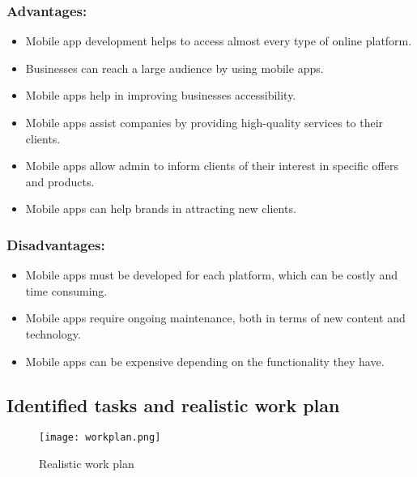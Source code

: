 \documentclass[11pt]{article}
\begin{document}
\subsubsection{Advantages:}
\begin{itemize}
\item Mobile app development helps to access almost every type of online platform.
\item Businesses can reach a large audience by using mobile apps.
\item Mobile apps help in improving businesses accessibility.
\item Mobile apps assist companies by providing high-quality services to their clients.
\item Mobile apps allow admin to inform clients of their interest in specific offers and products. 
\item Mobile apps can help brands in attracting new clients.

\end{itemize}

\subsubsection{Disadvantages:}
\begin{itemize}
\item Mobile apps must be developed for each platform, which can be costly and time consuming.
\item Mobile apps require ongoing maintenance, both in terms of new content and technology.
\item Mobile apps can be expensive depending on the functionality they have.
\end{itemize}

\begin{center}
\section{Identified tasks and realistic work plan}

\end{center}


\begin{figure} [h]
\begin{center}
\texttt{[image: workplan.png]}
\end{center}
\caption{Realistic work plan}
  \label{fig:workplan}
\end{figure}
\newpage 
\end{document}
